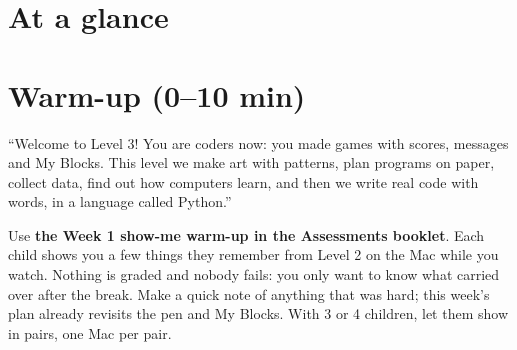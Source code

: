 \section{At a glance}
\begin{timeplan}
\end{timeplan}

\section{Warm-up (0--10 min)}
\begin{teacherscript}
\enquote{Welcome to Level 3! You are coders now: you made games with scores, messages and My Blocks. This level we make art with patterns, plan programs on paper, collect data, find out how computers learn, and then we write real code with words, in a language called Python.}
\end{teacherscript}

\begin{teachernote}
Use \textbf{the Week 1 show-me warm-up in the Assessments booklet}. Each child shows you a few things they remember from Level 2 on the Mac while you watch. Nothing is graded and nobody fails: you only want to know what carried over after the break. Make a quick note of anything that was hard; this week's plan already revisits the pen and My Blocks. With 3 or 4 children, let them show in pairs, one Mac per pair.
\end{teachernote}

